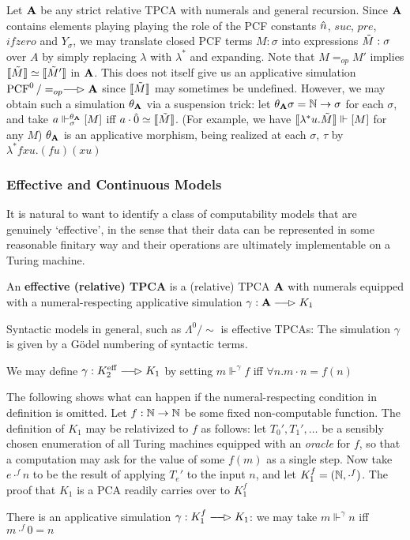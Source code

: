 \documentclass[11pt]{article}
\DeclareMathOperator{\PCF}{PCF}
\DeclareMathOperator{\eff}{eff}
\begin{document}
\begin{examplle}
Let \(\operatorname{\textbf{A}}\) be any strict relative TPCA with numerals and general recursion. Since \(\operatorname{\textbf{A}}\) contains
elements playing playing the role of the PCF constants \(\hat{n}\), \(suc\), \(pre\), \(ifzero\)
and \(Y_\sigma\), we may translate closed PCF terms \(M:\sigma\) into expressions \(\tilde{M}:\sigma\) over \(A\)
by simply replacing \(\lambda\) with \(\lambda^*\) and expanding. Note that \(M=_{op}M'\)
implies \(\llbracket \tilde{M} \rrbracket\simeq\llbracket \tilde{M}' \rrbracket\) in \(\operatorname{\textbf{A}}\). This does not itself give us an applicative
simulation \(\PCF^0/=_{op}\lrarhd\bA\) since \(\llbracket \tilde{M} \rrbracket\) may sometimes be undefined. However,
we may obtain such a simulation \(\theta_{\operatorname{\textbf{A}}}\) via a suspension trick: let \(\theta_{\operatorname{\textbf{A}}}\sigma=\mathbb{N}\to\sigma\) for each \(\sigma\),
and take \(a\Vdash_\sigma^{\theta_{\operatorname{\textbf{A}}}}[M]\) iff \(a\cdot\hat{0}\simeq\llbracket \tilde{M} \rrbracket\). (For example, we
have \(\llbracket \lambda^*u.\tilde{M} \rrbracket\Vdash[M]\) for any \(M\)) \(\theta_{\operatorname{\textbf{A}}}\) is an applicative morphism, being
realized at each \(\sigma\), \(\tau\) by \(\lambda^*fxu.(fu)(xu)\)
\end{examplle}
\subsubsection{Effective and Continuous Models}
\label{sec:org609a5ad}
It is natural to want to identify a class of computability models that are genuinely
‘effective’, in the sense that their data can be represented in some reasonable finitary way
and their operations are ultimately implementable on a Turing machine.

\begin{definition}[]
An \textbf{effective (relative) TPCA} is a (relative) TPCA \(\operatorname{\textbf{A}}\) with numerals equipped with a
numeral-respecting applicative simulation \(\gamma:\bA\lrarhd K_1\)
\end{definition}

Syntactic models in general, such as \(\Lambda^0/\sim\) is effective TPCAs: The simulation \(\gamma\) is given by a
Gödel numbering of syntactic terms.

We may define \(\gamma:K_2^{\eff}\lrarhd K_1\) by setting \(m\Vdash^\gamma f\) iff \(\forall n.m\cdot n=f(n)\)

\begin{examplle}[]
The following shows what can happen if the numeral-respecting condition in definition is
omitted. Let \(f:\mathbb{N}\to\mathbb{N}\) be some fixed non-computable function. The definition of \(K_1\) may be
relativized to \(f\) as follows: let \(T_0',T_1',\dots\) be a sensibly chosen enumeration of all
Turing machines equipped with an \emph{oracle} for \(f\), so that a computation may ask for the value
of some \(f(m)\) as a single step. Now take \(e\cdot^fn\) to be the result of applying \(T_e'\) to the
input \(n\), and let \(K_1^f=(\mathbb{N},\cdot^f)\). The proof that \(K_1\) is a PCA readily carries over
to \(K_1^f\)

There is an applicative simulation \(\gamma:K_1^f\lrarhd K_1\): we may take \(m\Vdash^\gamma n\) iff \(m\cdot^f0=n\)
\end{examplle}
\end{document}
